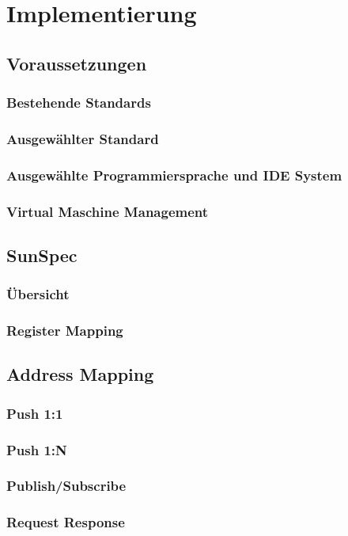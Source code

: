 \chapter{Implementierung}
\thispagestyle{standard}
\pagestyle{standard}

\section{Voraussetzungen}

\subsection{Bestehende Standards}

\subsection{Ausgewählter Standard}

\subsection{Ausgewählte Programmiersprache und IDE System}


\subsection{Virtual Maschine Management}

\section{SunSpec}


\subsection{Übersicht}


\subsection{Register Mapping}



\section{Address Mapping}

\subsection{Push 1:1}

\subsection{Push 1:N}

\subsection{Publish/Subscribe}

\subsection{Request Response}


